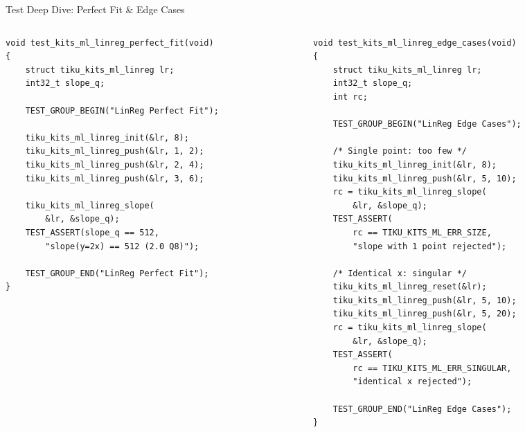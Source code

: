 \documentclass[aspectratio=169, 10pt]{beamer}
\begin{document}
\begin{frame}[fragile]{Test Deep Dive: Perfect Fit \& Edge Cases}
\begin{columns}[T]
\begin{column}{0.48\textwidth}
\begin{lstlisting}[style=cstyle,
  title={Perfect fit: $y = 2x$}]
void test_kits_ml_linreg_perfect_fit(void)
{
    struct tiku_kits_ml_linreg lr;
    int32_t slope_q;

    TEST_GROUP_BEGIN("LinReg Perfect Fit");

    tiku_kits_ml_linreg_init(&lr, 8);
    tiku_kits_ml_linreg_push(&lr, 1, 2);
    tiku_kits_ml_linreg_push(&lr, 2, 4);
    tiku_kits_ml_linreg_push(&lr, 3, 6);

    tiku_kits_ml_linreg_slope(
        &lr, &slope_q);
    TEST_ASSERT(slope_q == 512,
        "slope(y=2x) == 512 (2.0 Q8)");

    TEST_GROUP_END("LinReg Perfect Fit");
}
\end{lstlisting}
\end{column}

\begin{column}{0.48\textwidth}
\begin{lstlisting}[style=cstyle,
  title={Edge cases: singular data}]
void test_kits_ml_linreg_edge_cases(void)
{
    struct tiku_kits_ml_linreg lr;
    int32_t slope_q;
    int rc;

    TEST_GROUP_BEGIN("LinReg Edge Cases");

    /* Single point: too few */
    tiku_kits_ml_linreg_init(&lr, 8);
    tiku_kits_ml_linreg_push(&lr, 5, 10);
    rc = tiku_kits_ml_linreg_slope(
        &lr, &slope_q);
    TEST_ASSERT(
        rc == TIKU_KITS_ML_ERR_SIZE,
        "slope with 1 point rejected");

    /* Identical x: singular */
    tiku_kits_ml_linreg_reset(&lr);
    tiku_kits_ml_linreg_push(&lr, 5, 10);
    tiku_kits_ml_linreg_push(&lr, 5, 20);
    rc = tiku_kits_ml_linreg_slope(
        &lr, &slope_q);
    TEST_ASSERT(
        rc == TIKU_KITS_ML_ERR_SINGULAR,
        "identical x rejected");

    TEST_GROUP_END("LinReg Edge Cases");
}
\end{lstlisting}
\end{column}
\end{columns}
\end{frame}

\end{document}
